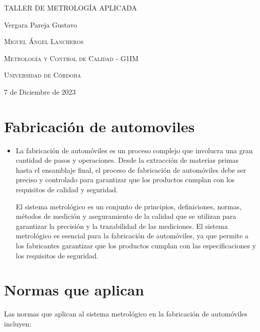\documentclass{article}
\author{Gustavo Vergara}
\theoremstyle{mytheoremstyle}
\theoremstyle{mytheoremstyle}
\theoremstyle{myproblemstyle}
\begin{document}
\pgfplotsset{compat=1.18}

\begin{titlepage}
	\centering
	\vspace{2.5cm}
	{\scshape \Large TALLER DE METROLOGÍA APLICADA\par}
	\vspace{5cm}
	\textbf\large\scshape{\par}
	\vspace{0.5cm}
	{\Large Vergara Pareja Gustavo\par}
	\vspace{5cm}
	{\scshape\Large Miguel Ángel Lancheros\par}
	\vspace{0.3cm}
	{\scshape\Large Metrología y Control de Calidad - G1IM \par}
	\vspace{0.3cm}
	{\scshape\Large Universidad de Córdoba\par}
	\vspace{0.3cm}
	{\Large 7 de Diciembre de 2023 \par}
\end{titlepage}
\tableofcontents
\newpage
\section{Fabricación de automoviles}
\begin{itemize}
	\item La fabricación de automóviles es un proceso complejo que involucra una gran cantidad de pasos y operaciones. Desde la extracción de materias primas hasta el ensamblaje final, el proceso de fabricación de automóviles debe ser preciso y controlado para garantizar que los productos cumplan con los requisitos de calidad y seguridad.

	El sistema metrológico es un conjunto de principios, definiciones, normas, métodos de medición y aseguramiento de la calidad que se utilizan para garantizar la precisión y la trazabilidad de las mediciones. El sistema metrológico es esencial para la fabricación de automóviles, ya que permite a los fabricantes garantizar que los productos cumplan con las especificaciones y los requisitos de seguridad.
\end{itemize}
\section{Normas que aplican}
Las normas que aplican al sistema metrológico en la fabricación de automóviles incluyen:
\end{document}
